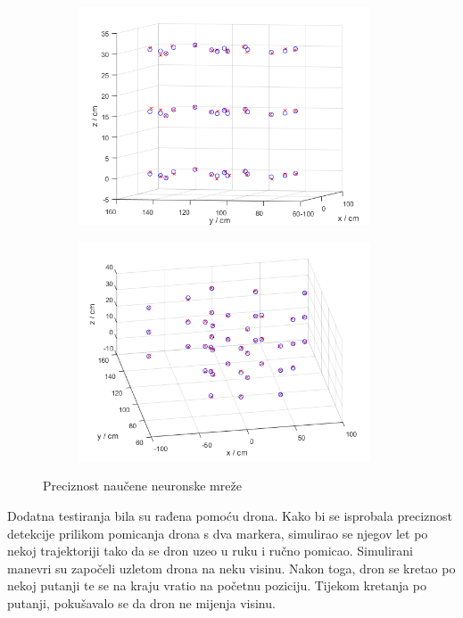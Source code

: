 \documentclass[times, utf8, diplomski]{fer}
\begin{document}
\begin{figure}[h]
\begin{subfigure}[b]{.5\textwidth}
\centering
	\includegraphics[width=0.95\textwidth]{trening1}
	\caption*{}
	\label{fig:trening_1}
\end{subfigure}
\begin{subfigure}[b]{.5\textwidth}
	\centering
	\includegraphics[width=0.95\textwidth]{trening2}
	\caption*{}
	\label{fig:trening_2}
\end{subfigure}
\caption{Preciznost naučene neuronske mreže}
\label{fig:trening}
\end{figure}

Dodatna testiranja bila su rađena pomoću drona. Kako bi se isprobala preciznost detekcije prilikom pomicanja drona s dva markera, simulirao se njegov let po nekoj trajektoriji tako da se dron uzeo u ruku i ručno pomicao. Simulirani manevri su započeli uzletom drona na neku visinu. Nakon toga, dron se kretao po nekoj putanji te se na kraju vratio na početnu poziciju. Tijekom kretanja po putanji, pokušavalo se da dron ne mijenja visinu.
\end{document}
